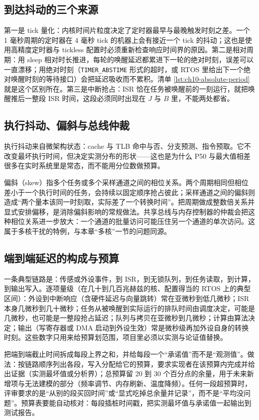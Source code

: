 \documentclass[12pt,a4paper,fontset=fandol]{ctexbook}
\newcommand{\Tp}[1]{\texttt{#1}}
\newcommand{\Lang}[1]{\textsf{#1}}
\newcommand{\DomRtos}{\Lang{RTOS}}
\begin{document}
\subsection*{到达抖动的三个来源}

第一是 tick 量化：内核时间片粒度决定了定时器最早与最晚触发时刻之差。一个 1 毫秒周期的定时器在 4 毫秒 tick 的机器上会有接近一个 tick 的抖动；这也是使用高精度定时器与 tickless 配置时必须重新检查响应时间界的原因。第二是相对周期：用 sleep 相对时长推进，每轮的唤醒延迟都累进下一轮的绝对时刻，误差可以一直漂移；用绝对时刻（\Tp{TIMER\_ABSTIME} 形式的超时，或 \DomRtos{} 里给出下一个绝对唤醒时刻的等待接口）会把延迟吸收而不累积。清单 \ref{lst:ch10-absolute-period} 就是这个区别所在。第三是中断抢占：ISR 恰在任务被唤醒前的一刻运行，就把唤醒推后一整段 ISR 时间，这段必须同时出现在 $J$ 与 $B$ 里，不能两处都省。

\subsection*{执行抖动、偏斜与总线仲裁}

执行抖动来自微架构状态：cache 与 TLB 命中与否、分支预测、指令预取。它不改变最坏执行时间，但决定实测分布的形状——这也是为什么 P50 与最大值相差很多在实时系统里是常态，而不能用分位数做预算。

偏斜（skew）指多个任务或多个采样通道之间的相位关系。两个周期相同但相位差小于一个执行时间的任务，会持续以固定顺序抢占彼此；采样通道之间的偏斜则造成“两个量本该同一时刻取，实际差了一个转换时间”。把周期做成整数倍关系并显式安排偏移，是消除偏斜影响的常规做法。共享总线与内存控制器的仲裁会把这种相位关系进一步放大：一个通道的批量访问可能压住另一个通道的单次访问。这属于多核干扰的特例，与本章“多核”一节的问题同源。

\subsection*{端到端延迟的构成与预算}

一条典型链路是：传感或外设事件，到 ISR，到无锁队列，到任务读取，到计算，到输出写入。逐项量级（在几十到几百兆赫兹的核、配置得当的 \DomRtos{} 上的典型区间）：外设到中断响应（含硬件延迟与向量跳转）常在亚微秒到低几微秒；ISR 本身几微秒到几十微秒；任务从被唤醒到实际运行的排队时间由调度决定，可能是几微秒，也可能是一整段抢占延迟；队列与拷贝在亚微秒到几微秒；计算由算法决定；输出（写寄存器或 DMA 启动到外设生效）常是微秒级再加外设自身的转换时刻。这些数字只用来给预算划范围，项目里必须以实测与论证值替换。

\begin{bestpractice}[title={延迟预算的分配方式}]
把端到端截止时间拆成每段上界之和，并给每段一个“承诺值”而不是“观测值”。做法：按链路顺序列出各段，写入分配给它的预算，要求实现者在该预算内完成并给出证据（实测最坏值或分析界）；总预算留 20 到 30 个百分点的余量，用于未来新增项与无法建模的部分（频率调节、内存刷新、温度降频）。任何一段超预算时，评审要求的是“从别的段买回时间”或“显式吃掉总余量并记录”，而不是“平均没问题”。预算表要能自动核对：每段插桩时间戳，把实测最坏值与承诺值一起输出到测试报告。
\end{bestpractice}
\end{document}
